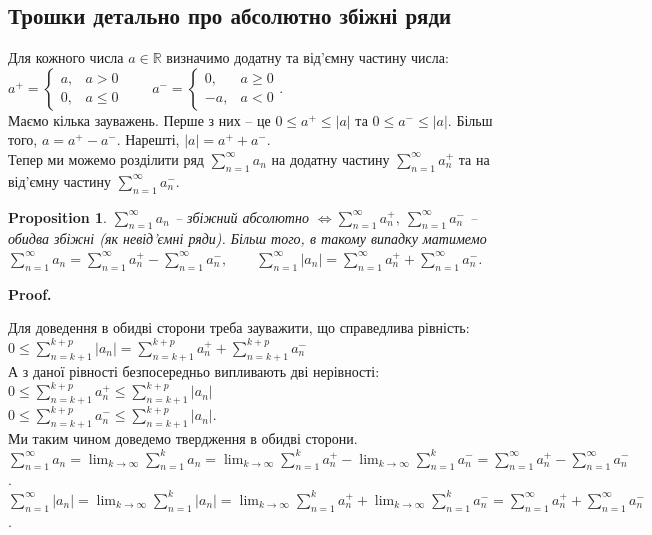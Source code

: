 \documentclass[a4paper, 10pt]{article}
\makeatletter
\def\qed{$\blacksquare$}
\theoremstyle{theoremdd}
\theoremstyle{theoremdd}
\theoremstyle{theoremdd}
\theoremstyle{theoremdd}
\theoremstyle{theoremdd}
\theoremstyle{theoremdd}
\newtheorem{proposition}[theorem]{Proposition}
\theoremstyle{theoremdd}
\theoremstyle{theoremdd}
\theoremstyle{theoremdd}
\renewenvironment{proof}[1][Proof.\\]{\par
\pushQED{\hfill \qed}%
\normalfont \topsep6\p@\@plus6\p@\relax
\trivlist
\item\relax
{\bfseries
#1\@addpunct{.}}\hspace\labelsep\ignorespaces
}{%
\popQED\endtrivlist\@endpefalse
}
\makeatother
\begin{document}
\subsection{Трошки детально про абсолютно збіжні ряди}
Для кожного числа $a \in \mathbb{R}$ визначимо додатну та від'ємну частину числа:\\
$a^+ = \begin{cases} a,& a > 0 \\ 0, & a \leq 0 \end{cases} \qquad a^- = \begin{cases} 0, & a \geq 0 \\ -a, & a < 0 \end{cases}$.\\
Маємо кілька зауважень. Перше з них -- це $0 \leq a^+ \leq |a|$ та $0 \leq a^- \leq |a|$. Більш того, $a = a^+ - a^-$. Нарешті, $|a| = a^+ + a^-$.\\
Тепер ми можемо розділити ряд $\displaystyle\sum_{n=1}^\infty a_n$ на додатну частину $\displaystyle\sum_{n=1}^\infty a_n^+$ та на від'ємну частину $\displaystyle\sum_{n=1}^\infty a_n^-$.

\begin{proposition}
$\displaystyle\sum_{n=1}^\infty a_n$ -- збіжний абсолютно $\iff \displaystyle\sum_{n=1}^\infty a_n^+,\ \sum_{n=1}^\infty a_n^-$ -- обидва збіжні (як невід'ємні ряди). Більш того, в такому випадку матимемо\\
$\displaystyle\sum_{n=1}^\infty a_n = \sum_{n=1}^\infty a_n^+ - \sum_{n=1}^\infty a_n^-, \qquad \sum_{n=1}^\infty |a_n| = \sum_{n=1}^\infty a_n^+ + \sum_{n=1}^\infty a_n^-$.
\end{proposition}

\begin{proof}
Для доведення в обидві сторони треба зауважити, що справедлива рівність:\\
$0 \leq \displaystyle\sum_{n=k+1}^{k+p} |a_n| = \sum_{n=k+1}^{k+p} a_n^+ + \sum_{n=k+1}^{k+p} a_n^-$\\
А з даної рівності безпосередньо випливають дві нерівності:\\
$0 \leq \displaystyle\sum_{n=k+1}^{k+p} a_n^+ \leq \sum_{n=k+1}^{k+p} |a_n|$\\
$0 \leq \displaystyle\sum_{n=k+1}^{k+p} a_n^- \leq \sum_{n=k+1}^{k+p} |a_n|$.\\
Ми таким чином доведемо твердження в обидві сторони.
\bigskip \\
$\displaystyle\sum_{n=1}^\infty a_n = \lim_{k \to \infty} \sum_{n=1}^k a_n = \lim_{k \to \infty} \sum_{n=1}^k a_n^+ - \lim_{k \to \infty} \sum_{n=1}^k a_n^- = \sum_{n=1}^\infty a_n^+ - \sum_{n=1}^\infty a_n^-$.\\
$\displaystyle\sum_{n=1}^\infty |a_n| = \lim_{k \to \infty} \sum_{n=1}^k |a_n| = \lim_{k \to \infty} \sum_{n=1}^k a_n^+ + \lim_{k \to \infty} \sum_{n=1}^k a_n^- = \sum_{n=1}^\infty a_n^+ + \sum_{n=1}^\infty a_n^-$.
\end{proof}
\end{document}
